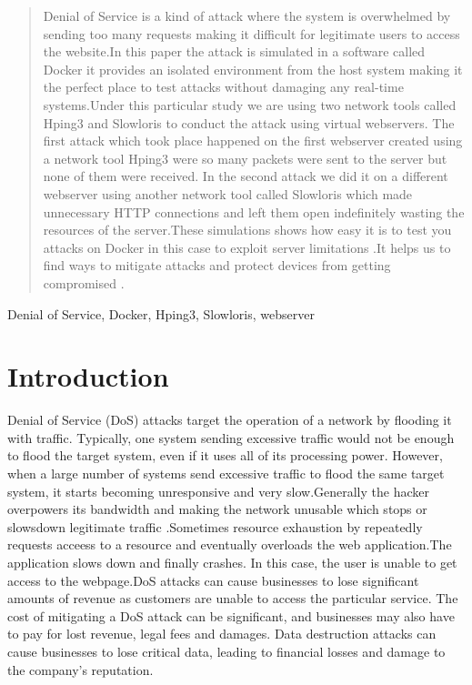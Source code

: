 \documentclass[conference]{IEEEtran}
\begin{document}
\begin{abstract}
Denial of Service is  a kind of attack where the system is overwhelmed by sending too many requests making it difficult  for legitimate users to access the website.In this paper the attack is simulated in a software called Docker it  provides an isolated environment from the host system making it the perfect place to test attacks without damaging any real-time systems.Under this particular study   we are using  two network tools called Hping3 and Slowloris to conduct the attack using virtual webservers. The first attack which took place happened on the first webserver  created using a network tool Hping3 were so many packets were sent to the server but none  of them were received.
In the second attack  we did it  on  a different webserver using another network tool called Slowloris which made unnecessary HTTP connections and left them open indefinitely wasting the resources of the server.These simulations shows how easy it is to test you attacks on Docker in this case to exploit server limitations .It helps us to find ways to mitigate attacks and protect devices from getting compromised .
\end{abstract}

\begin{IEEEkeywords}

\hspace{0.1cm} Denial of Service, Docker, Hping3, Slowloris, webserver
\end{IEEEkeywords}

\section{Introduction}

Denial of Service (DoS) attacks target the operation of a network by flooding it with traffic. Typically, one system sending excessive traffic would not be enough to flood the target system, even if it uses all of its processing power. However, when a large number of systems send excessive traffic to flood the same target system, it starts becoming unresponsive and very slow.Generally the hacker  overpowers  its bandwidth and making the network unusable which stops or slowsdown legitimate traffic .Sometimes resource exhaustion by repeatedly requests acceess to a resource and eventually overloads the web application.The application slows down and finally crashes. In this case, the user is unable to get access to the webpage.DoS attacks can cause businesses to lose significant amounts of revenue as customers are unable to access the  particular service. The cost of mitigating a DoS attack can be significant, and businesses may also have to pay for lost revenue, legal fees and damages. Data destruction attacks can cause businesses to lose critical data, leading to financial losses and damage to the company’s reputation.
\end{document}
